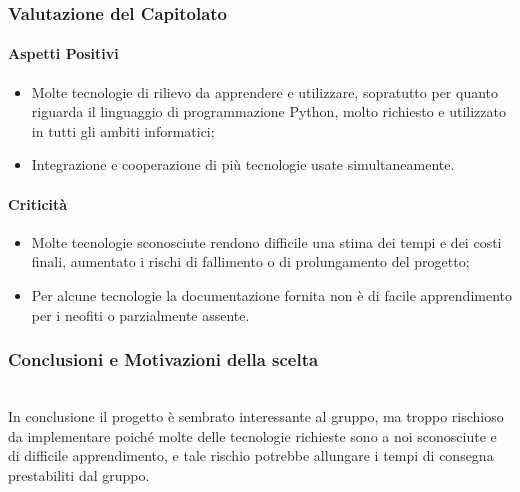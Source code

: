 \subsubsection{Valutazione del Capitolato}

\paragraph{Aspetti Positivi}
\begin{itemize}
	\item Molte tecnologie di rilievo da apprendere e utilizzare, sopratutto per quanto riguarda il linguaggio di programmazione Python, molto richiesto e utilizzato in tutti gli ambiti informatici;
	\item Integrazione e cooperazione di più tecnologie usate simultaneamente. 
\end{itemize}

\paragraph{Criticità}
\begin{itemize}
	\item Molte tecnologie sconosciute rendono difficile una stima dei tempi e dei costi finali, aumentato i rischi di fallimento o di prolungamento del progetto; 
	\item Per alcune tecnologie la documentazione fornita non è di facile apprendimento per i neofiti o parzialmente assente. 
\end{itemize}


\subsubsection{Conclusioni e Motivazioni della scelta}\-\\
In conclusione il progetto è sembrato interessante al gruppo, ma troppo rischioso da implementare poiché molte delle tecnologie richieste sono a noi sconosciute e di difficile apprendimento, e tale rischio potrebbe allungare i tempi di consegna prestabiliti dal gruppo.  

